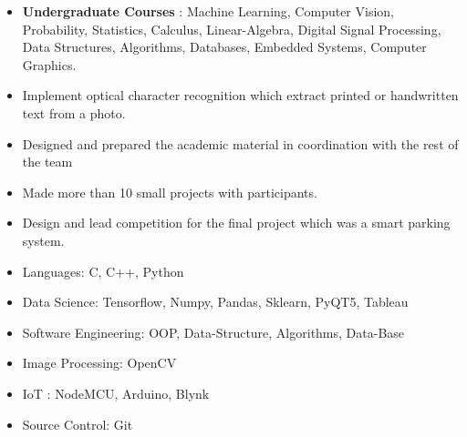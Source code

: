 \documentclass[10pt,a4paper,ragged2e]{altacv}
\begin{document}

\begin{fullwidth}
\makecvheader
\end{fullwidth}



\begin{itemize}
\item   \textbf {Undergraduate Courses} : Machine Learning, Computer Vision, Probability, Statistics, Calculus, Linear-Algebra, Digital Signal Processing, Data Structures, Algorithms, Databases, Embedded Systems, Computer Graphics.
  
\end{itemize}


\begin{itemize}
\item Implement optical character recognition which extract printed or handwritten text from a photo.  
\end{itemize}

\begin{itemize}
\item Designed and prepared the academic material in coordination with the rest of the team
\smallskip
\item Made more than 10 small projects with participants.
\smallskip
\item Design and lead competition for the final project which was a smart parking system.
\end{itemize}



\begin{itemize}
\item Languages: C, C++, Python
\smallskip
\item Data Science: Tensorflow, Numpy, Pandas, Sklearn, PyQT5, Tableau
\smallskip
\item Software Engineering: OOP, Data-Structure, Algorithms, Data-Base
\smallskip
\item Image Processing: OpenCV
\smallskip
\item IoT : NodeMCU, Arduino, Blynk
\smallskip
\item Source Control: Git 
\end{itemize}
\end{document}
